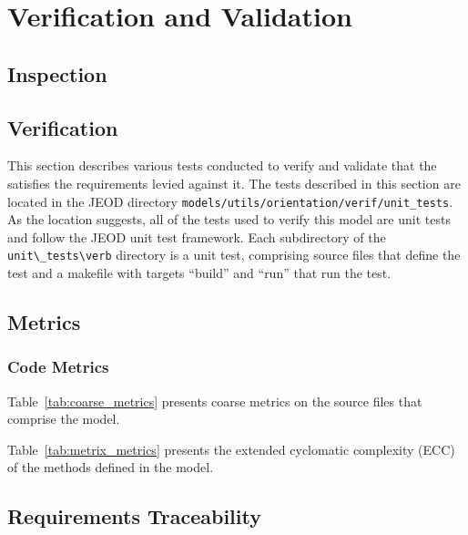 \chapter{Verification and Validation}\label{ch:ivv}

\section{Inspection}\label{sec:inspect}


\section{Verification}\label{sec:verif}
This section describes various tests conducted to verify and validate
that the \ModelDesc satisfies the requirements levied against it.
The tests described in this section are located in the JEOD directory
\verb+models/utils/orientation/verif/unit_tests+. As the location suggests,
all of the tests used to verify this model are unit tests and follow the
JEOD unit test framework. Each subdirectory of the \verb+unit\_tests\verb+
directory is a unit test, comprising source files that define the test and
a makefile with targets ``build'' and ``run'' that run the test.

\newpage

\newpage

\newpage

\newpage
\section{Metrics}\label{sec:metrics}
\subsection{Code Metrics}
Table~\ref{tab:coarse_metrics} presents coarse metrics on the source
files that comprise the model.



Table~\ref{tab:metrix_metrics} presents the extended cyclomatic complexity
(ECC) of the methods defined in the model.




\newpage
\section{Requirements Traceability}

